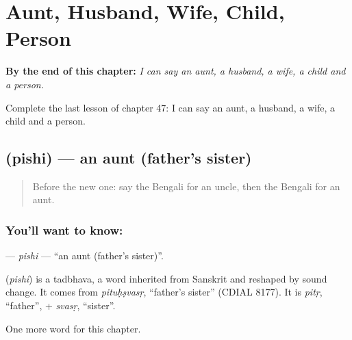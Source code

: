 
\chapter{Aunt, Husband, Wife, Child, Person}
\label{ch:bn-aunt-husband-wife-child-person}

\begin{chapteropening}
\textbf{By the end of this chapter:} \emph{I can say an aunt, a husband, a wife, a child and a person.}

Complete the last lesson of chapter 47: I can say an aunt, a husband, a wife, a child and a person.
\end{chapteropening}

\section[\texorpdfstring{\bn{পিসি} (pishi)}{পিসি (pishi)}]{ (pishi) — an aunt (father's sister)}

\label{lesson:BN-C47-pishi}



\begin{quote}
Before the new one: say the Bengali for an uncle, then the Bengali for an aunt.
\end{quote}

\subsection*{You'll want to know: }
\textbf{} — \emph{pishi} — \textquotedblleft{}an aunt (father's sister)\textquotedblright{}.

\begin{cousinweb}
\textbf{} (\emph{pishi}) is a tadbhava, a word inherited from Sanskrit and reshaped by sound change. It comes from \emph{pituḥṣvasṛ}, \textquotedblleft{}father's sister\textquotedblright{} (CDIAL 8177). It is \emph{pitṛ}, \textquotedblleft{}father\textquotedblright{}, + \emph{svasṛ}, \textquotedblleft{}sister\textquotedblright{}.
\end{cousinweb}

\begin{grammarlens}[title={What you've built}]
One more word for this chapter.
\end{grammarlens}

